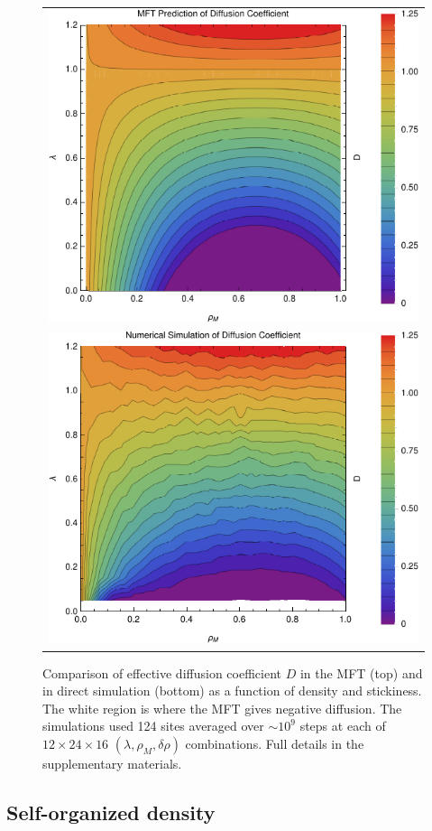 \documentclass[
reprint, amsmath,amssymb, aps,
 pre, longbibliography,
]{revtex4-1}
\begin{document}
\begin{figure}[h!]
\vspace{1em}
\begin{center}
 \begin{tabular}{c}
    \includegraphics[width=0.7\linewidth]{newAnalFlow} \\
    \includegraphics[width=0.7\linewidth]{newDataFlow}
    \end{tabular}
\end{center}
\caption{\label{fig:diffCoef}
Comparison of effective diffusion coefficient $D$ in the MFT (top) and in direct simulation (bottom) as a function of density and stickiness.
The white region is where the MFT gives negative diffusion. The simulations used 124 sites averaged over $\sim 10^9$ steps at each of $12 \times 24 \times 16 $ $(\lambda, \rho_M, \delta \rho)$ combinations.  
Full details in the supplementary materials.}
    \vspace{-2em}
\end{figure}


\subsection{Self-organized density}
\end{document}
